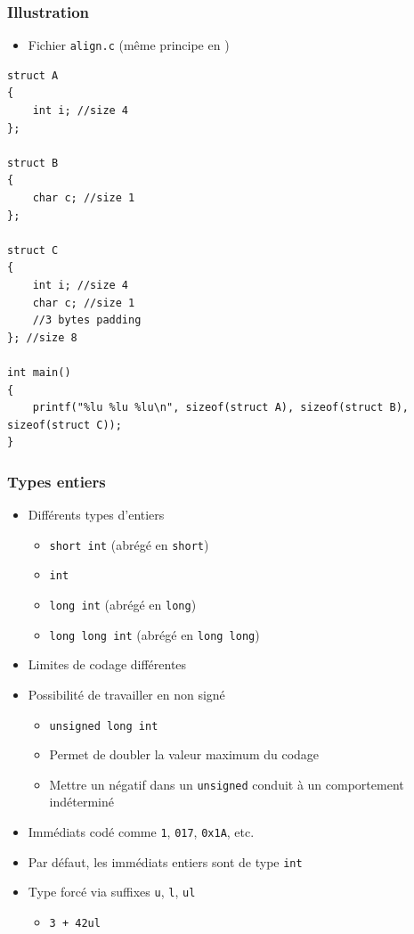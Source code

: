 \begin{frame}[containsverbatim]
\frametitle{Illustration}
\begin{itemize}
\item Fichier \texttt{align.c} (même principe en \cpp)
\end{itemize}
\begin{lstlisting}
struct A
{
	int i; //size 4
};

struct B
{
	char c; //size 1
};

struct C
{
	int i; //size 4
	char c; //size 1
	//3 bytes padding
}; //size 8

int main()
{
	printf("%lu %lu %lu\n", sizeof(struct A), sizeof(struct B), sizeof(struct C));
}
\end{lstlisting}
\end{frame}

\begin{frame}
\frametitle{Types entiers}
\begin{itemize}[<+->]
\item Différents types d'entiers
	\begin{itemize}
	\item \lstinline|short int| (abrégé en \lstinline|short|)
	\item \lstinline|int|
	\item \lstinline|long int| (abrégé en \lstinline|long|)
	\item \lstinline|long long int| (abrégé en \lstinline|long long|)
	\end{itemize}
\item Limites de codage différentes
\item Possibilité de travailler en non signé
	\begin{itemize}
	\item \lstinline|unsigned long int|
	\item Permet de doubler la valeur maximum du codage
	\item Mettre un négatif dans un \lstinline|unsigned| conduit à un comportement indéterminé
	\end{itemize}
\item Immédiats codé comme \texttt{1}, \texttt{017}, \texttt{0x1A}, etc.
\item Par défaut, les immédiats entiers sont de type \lstinline|int|
\item Type forcé via suffixes \texttt{u}, \texttt{l}, \texttt{ul}
	\begin{itemize}
	\item \texttt{3 + 42ul}
	\end{itemize}
\end{itemize}
\end{frame}

